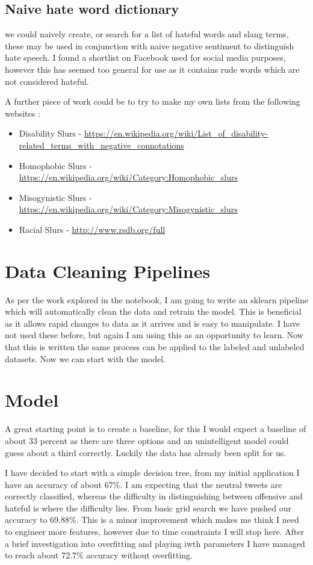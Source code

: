\documentclass[a4paper]{article}
\begin{document}
\subsection{Naive hate word dictionary}
we could naively create, or search for a list of hateful words and slang terms, these may be used in conjunction with naive negative sentiment to distinguish hate speech. I found a shortlist on Facebook used for social media purposes, however this has seemed too general for use as it contains rude words which are not considered hateful. 

A further piece of work could be to try to make my own lists from the following websites :
\begin{itemize}
\item Disability Slurs - \url{https://en.wikipedia.org/wiki/List_of_disability-related_terms_with_negative_connotations}
\item Homophobic Slurs - \url{https://en.wikipedia.org/wiki/Category:Homophobic_slurs}
\item Misogynistic Slurs - \url{https://en.wikipedia.org/wiki/Category:Misogynistic_slurs}
\item Racial Slurs - \url{http://www.rsdb.org/full}
\end{itemize}

\section{Data Cleaning Pipelines}
As per the work explored in the notebook, I am going to write an sklearn pipeline which will automatically clean the data and retrain the model. This is beneficial as it allows rapid changes to data as it arrives and is easy to manipulate. I have not used these before, but again I am using this as an opportunity to learn. Now that this is written the same process can be applied to the labeled and unlabeled datasets. Now we can start with the model.

\section{Model}
A great starting point is to create a baseline, for this I would expect a baseline of about 33 percent as there are three options and an unintelligent model could guess about a third correctly. Luckily the data has already been split for us.

I have decided to start with a simple decision tree, from my initial application I have an accuracy of about 67\%. I am expecting that the neutral tweets are correctly classified, whereas the difficulty in distinguishing between offensive and hateful is where the difficulty lies. From basic grid search we have pushed our accuracy to 69.88\%. This is a minor improvement which makes me think I need to engineer more features, however due to time constraints I will stop here. After a brief investigation into overfitting and playing iwth parameters I have managed to reach about 72.7\% accuracy without overfitting.
\end{document}
